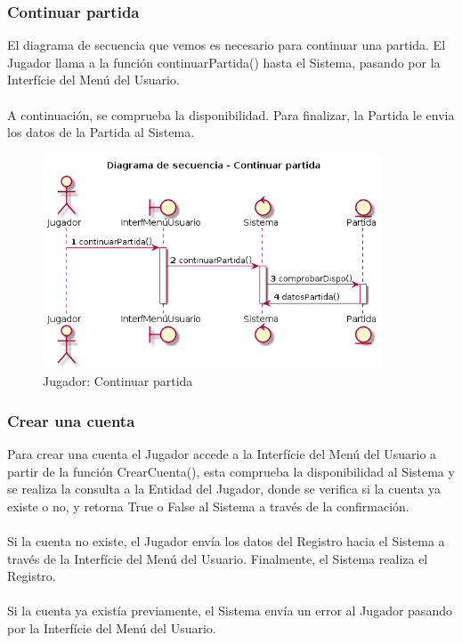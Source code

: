  
\newpage
\subsubsection{Continuar partida}
  El diagrama de secuencia que vemos es necesario para continuar una partida. El Jugador llama a la función continuarPartida() hasta el Sistema, pasando por la Interfície del Menú del Usuario.\\
  \\ A continuación, se comprueba la disponibilidad. Para finalizar, la Partida le envia los datos de la Partida al Sistema.
  
  \begin{figure}[ht]
 \centering
 	  \includegraphics[width=0.9\textwidth]{./imatges/jugador/Continuar_partida.png}
 \caption{Jugador: Continuar partida}
 \end{figure}
    

\newpage 
\subsubsection{Crear una cuenta}
  Para crear una cuenta el Jugador accede a la Interfície del Menú del Usuario a partir de la función CrearCuenta(), esta comprueba la disponibilidad al Sistema y se realiza la consulta a la Entidad del Jugador, donde se verifica si la cuenta ya existe o no, y retorna True o False al Sistema a través de la confirmación.\\
  \\Si la cuenta no existe, el Jugador envía los datos del Registro hacia el Sistema a través de la Interfície del Menú del Usuario. Finalmente, el Sistema realiza el Registro.\\
  \\Si la cuenta ya existía previamente, el Sistema envía un error al Jugador pasando por la Interfície del Menú del Usuario.
  
